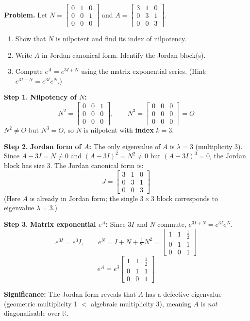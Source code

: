 \documentclass[12pt,a4paper]{article}
\newcommand{\step}[1]{\noindent\textbf{Step #1.}\;}
\newcommand{\R}{\mathbb{R}}
\newcommand{\mat}[1]{\begin{bmatrix}#1\end{bmatrix}}
\begin{document}
	\begin{tcolorbox}[worked]
		\textbf{Problem.} Let $N=\mat{0&1&0\\0&0&1\\0&0&0}$ and $A=\mat{3&1&0\\0&3&1\\0&0&3}$.
		
		\begin{enumerate}[label=(\alph*), nosep]
			\item Show that $N$ is nilpotent and find its index of nilpotency.
			\item Write $A$ in Jordan canonical form. Identify the Jordan block(s).
			\item Compute $e^A = e^{3I+N}$ using the matrix exponential series. (Hint: $e^{3I+N} = e^{3I}e^N$.)
		\end{enumerate}
		
		\step{1} \textbf{Nilpotency of $N$:}
		\[
		N^2 = \mat{0&0&1\\0&0&0\\0&0&0},\qquad N^3 = \mat{0&0&0\\0&0&0\\0&0&0} = O
		\]
		$N^2 \neq O$ but $N^3 = O$, so $N$ is nilpotent with \textbf{index} $k=3$.
		
		\step{2} \textbf{Jordan form of $A$:}
		The only eigenvalue of $A$ is $\lambda = 3$ (multiplicity 3).
		Since $A - 3I = N \neq 0$ and $(A-3I)^2 = N^2 \neq 0$ but $(A-3I)^3=0$,
		the Jordan block has size 3. The Jordan canonical form is:
		\[
		J = \mat{3&1&0\\0&3&1\\0&0&3}
		\]
		(Here $A$ is already in Jordan form; the single $3\times3$ block corresponds to eigenvalue $\lambda=3$.)
		
		\step{3} \textbf{Matrix exponential $e^A$:}
		Since $3I$ and $N$ commute, $e^{3I+N}=e^{3I}e^N$.
		\[
		e^{3I} = e^3 I,\qquad
		e^N = I + N + \tfrac{1}{2!}N^2 = \mat{1&1&\frac{1}{2}\\0&1&1\\0&0&1}
		\]
		\[
		e^A = e^3 \mat{1&1&\frac{1}{2}\\0&1&1\\0&0&1}
		\]
		
		\textbf{Significance:} The Jordan form reveals that $A$ has a defective eigenvalue (geometric multiplicity 1 $<$ algebraic multiplicity 3), meaning $A$ is \emph{not} diagonalisable over $\R$.
	\end{tcolorbox}
	
\end{document}
